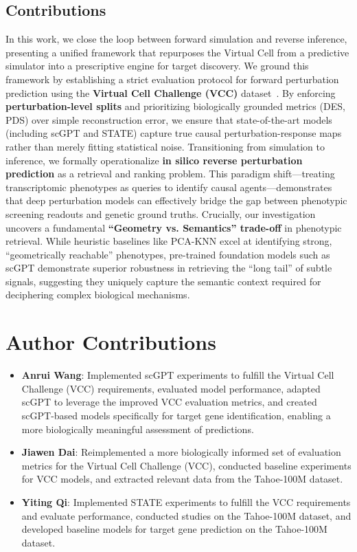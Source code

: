 \documentclass{article}
\begin{document}
\subsection{Contributions}

In this work, we close the loop between forward simulation and reverse inference, presenting a unified framework that repurposes the Virtual Cell from a predictive simulator into a prescriptive engine for target discovery. We ground this framework by establishing a strict evaluation protocol for forward perturbation prediction using the \textbf{Virtual Cell Challenge (VCC)} dataset~\cite{roohani_virtual_2025}. By enforcing \textbf{perturbation-level splits} and prioritizing biologically grounded metrics (DES, PDS) over simple reconstruction error, we ensure that state-of-the-art models (including scGPT and STATE) capture true causal perturbation-response maps rather than merely fitting statistical noise. Transitioning from simulation to inference, we formally operationalize \textbf{in silico reverse perturbation prediction} as a retrieval and ranking problem. This paradigm shift—treating transcriptomic phenotypes as queries to identify causal agents—demonstrates that deep perturbation models can effectively bridge the gap between phenotypic screening readouts and genetic ground truths. Crucially, our investigation uncovers a fundamental \textbf{``Geometry vs. Semantics'' trade-off} in phenotypic retrieval. While heuristic baselines like PCA-KNN excel at identifying strong, ``geometrically reachable'' phenotypes, pre-trained foundation models such as scGPT demonstrate superior robustness in retrieving the ``long tail'' of subtle signals, suggesting they uniquely capture the semantic context required for deciphering complex biological mechanisms.

\section*{Author Contributions}

\begin{itemize}
    \item \textbf{Anrui Wang}: Implemented scGPT experiments to fulfill the Virtual Cell Challenge (VCC) requirements, evaluated model performance, adapted scGPT to leverage the improved VCC evaluation metrics, and created scGPT-based models specifically for target gene identification, enabling a more biologically meaningful assessment of predictions.
    
    \item \textbf{Jiawen Dai}: Reimplemented a more biologically informed set of evaluation metrics for the Virtual Cell Challenge (VCC), conducted baseline experiments for VCC models, and extracted relevant data from the Tahoe-100M dataset.
    
    \item \textbf{Yiting Qi}: Implemented STATE experiments to fulfill the VCC requirements and evaluate performance, conducted studies on the Tahoe-100M dataset, and developed baseline models for target gene prediction on the Tahoe-100M dataset.
\end{itemize}
	
\end{document}
